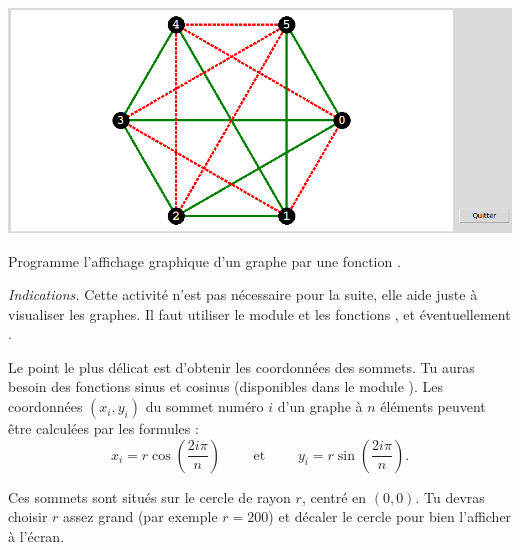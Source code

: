 \documentclass[11pt,class=report,crop=false]{standalone}
\begin{document}
\begin{activite}


\begin{center}
\includegraphics[scale=0.4]{ecran-ramsey-2}
\end{center}

Programme l'affichage graphique d'un graphe par une fonction .
     
\bigskip
     
\emph{Indications.} Cette activité n'est pas nécessaire pour la suite, elle aide juste à visualiser les graphes. Il faut utiliser le module  et les fonctions ,  et éventuellement . 

Le point le plus délicat est d'obtenir les coordonnées des sommets. Tu auras besoin des fonctions sinus et cosinus (disponibles dans le module ).
Les coordonnées $(x_i,y_i)$ du sommet numéro $i$ d'un graphe à $n$ éléments peuvent être calculées par les formules :
$$x_i = r \cos\left(\frac{2 i \pi}{n}\right) \qquad \text{ et } \qquad y_i = r\sin\left(\frac{2 i \pi}{n}\right).$$

Ces sommets sont situés sur le cercle de rayon $r$, centré en $(0,0)$. 
Tu devras choisir $r$ assez grand (par exemple $r=200$) et décaler le cercle pour bien l'afficher à l'écran.


\end{activite}

\end{document}
